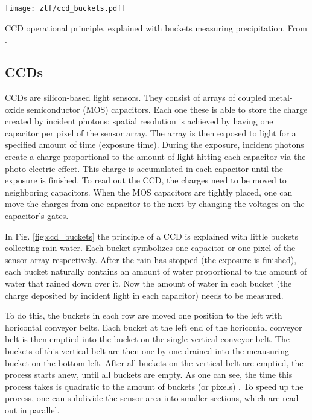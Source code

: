 \begin{marginfigure}
    \texttt{[image: ztf/ccd\_buckets.pdf]}
    \caption[CCD operational principle]{CCD operational principle, explained with buckets measuring precipitation. From \cite{Janesick1987}.}
\end{marginfigure}

\subsection{CCDs}
CCDs are silicon-based light sensors. They consist of arrays of coupled metal-oxide semiconductor (MOS) capacitors. Each one these is able to store the charge created by incident photons; spatial resolution is achieved by having one capacitor per pixel of the sensor array. The array is then exposed to light for a specified amount of time (exposure time). During the exposure, incident photons create a charge proportional to the amount of light hitting each capacitor via the photo-electric effect. This charge is accumulated in each capacitor until the exposure is finished. To read out the CCD, the charges need to be moved to neighboring capacitors. When the MOS capacitors are tightly placed, one can move the charges from one capacitor to the next by changing the voltages on the capacitor's gates.

In Fig. \ref{fig:ccd_buckets} the principle of a CCD is explained with little buckets collecting rain water. Each bucket symbolizes one capacitor or one pixel of the sensor array respectively. After the rain has stopped (the exposure is finished), each bucket naturally contains an amount of water proportional to the amount of water that rained down over it. Now the amount of water in each bucket (the charge deposited by incident light in each capacitor) needs to be measured.

To do this, the buckets in each row are moved one position to the left with horicontal conveyor belts. Each bucket at the left end of the horicontal conveyor belt is then emptied into the bucket on the single vertical conveyor belt. The buckets of this vertical belt are then one by one drained into the meausuring bucket on the bottom left. After all buckets on the vertical belt are emptied, the process starts anew, until all buckets are empty. As one can see, the time this process takes is quadratic to the amount of buckets (or pixels) . To speed up the process, one can subdivide the sensor area into smaller sections, which are read out in parallel.

